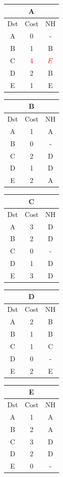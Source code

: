 \documentclass[10pt]{article}
\begin{document}
			\begin{table}[h!]
				\begin{tabular}{|c||c||c|}
					\hline
					\multicolumn{3}{|c|}{A} \\
					\hline
					Dst & Cost & NH \\
					\hline
					A & 0 & - \\
					B & 1 & B \\
					C & $\color{red} 4$ & $\color{red} E$ \\
					D & 2 & B \\
					E & 1 & E \\
					\hline
				\end{tabular}
				\begin{tabular}{|c||c||c|}
					\hline
					\multicolumn{3}{|c|}{B} \\
					\hline
					Dst & Cost & NH \\
					\hline
					A & 1 & A \\
					B & 0 & - \\
					C & 2 & D \\
					D & 1 & D \\
					E & 2 & A \\
					\hline
				\end{tabular}
				\begin{tabular}{|c||c||c|}
					\hline
					\multicolumn{3}{|c|}{C} \\
					\hline
					Dst & Cost & NH \\
					\hline
					A & 3 & D \\
					B & 2 & D \\
					C & 0 & - \\
					D & 1 & D \\
					E & 3 & D \\
					\hline
				\end{tabular}
				\begin{tabular}{|c||c||c|}
					\hline
					\multicolumn{3}{|c|}{D} \\
					\hline
					Dst & Cost & NH \\
					\hline
					A & 2 & B \\
					B & 1 & B \\
					C & 1 & C \\
					D & 0 & - \\
					E & 2 & E \\
					\hline
				\end{tabular}
				\begin{tabular}{|c||c||c|}
					\hline
					\multicolumn{3}{|c|}{E} \\
					\hline
					Dst & Cost & NH \\
					\hline
					A & 1 & A \\
					B & 2 & A \\
					C & 3 & D \\
					D & 2 & D \\
					E & 0 & - \\
					\hline
				\end{tabular}
			\end{table}
\end{document}
